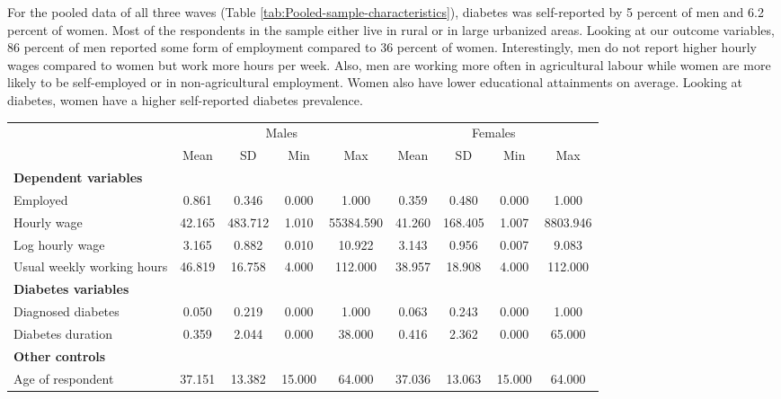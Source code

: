 For the pooled data of all three waves (Table \ref{tab:Pooled-sample-characteristics}),
diabetes was self-reported by 5 percent of men and 6.2 percent of
women. Most of the respondents in the sample either live in rural
or in large urbanized areas. Looking at our outcome variables, 86
percent of men reported some form of employment compared to 36 percent
of women. Interestingly, men do not report higher hourly wages compared
to women but work more hours per week. Also, men are working more
often in agricultural labour while women are more likely to be self-employed
or in non-agricultural employment. Women also have lower educational
attainments on average. Looking at diabetes, women have a higher self-reported
diabetes prevalence. 
\begin{table}[h!]
\begin{center}
{ \def\sym#1{\ifmmode^{#1}\else\(^{#1}\)\fi} \begin{tabular}{l*{2}{cccc}}
\toprule
                    &\multicolumn{4}{c}{Males}                          &\multicolumn{4}{c}{Females}                        \\
                    &        Mean&          SD&         Min&         Max&        Mean&          SD&         Min&         Max\\
\midrule
\textbf{Dependent variables} &&&&&&&& \\
Employed            &       0.861&       0.346&       0.000&       1.000&       0.359&       0.480&       0.000&       1.000\\
Hourly wage             &      42.165&     483.712&       1.010&   55384.590&      41.260&     168.405&       1.007&    8803.946\\
Log hourly wage     &       3.165&       0.882&       0.010&      10.922&       3.143&       0.956&       0.007&       9.083\\
Usual weekly working hours&      46.819&      16.758&       4.000&     112.000&      38.957&      18.908&       4.000&     112.000\\
\textbf{Diabetes variables} &&&&&&&& \\
Diagnosed diabetes  &       0.050&       0.219&       0.000&       1.000&       0.063&       0.243&       0.000&       1.000\\
Diabetes duration   &       0.359&       2.044&       0.000&      38.000&       0.416&       2.362&       0.000&      65.000\\
\textbf{Other controls} &&&&&&&& \\
Age of respondent   &      37.151&      13.382&      15.000&      64.000&      37.036&      13.063&      15.000&      64.000\\

\end{tabular}}
\end{center}
\end{table}
